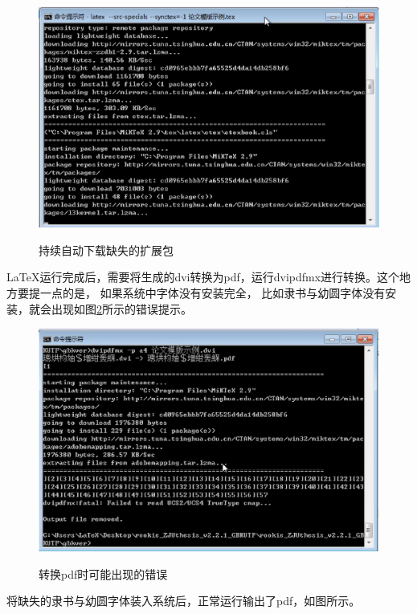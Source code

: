 \begin{figure}[th]
	\centering
	\includegraphics[scale=0.5]{./Pictures/l3kernel.eps}\\
	\caption{持续自动下载缺失的扩展包}
	\label{l3kernel}
\end{figure}

\newpage

\LaTeX 运行完成后，需要将生成的dvi转换为pdf，运行dvipdfmx进行转换。这个地方要提一点的是，
如果系统中字体没有安装完全， 比如隶书与幼圆字体没有安装，就会出现如图\ref{dvierror}所示的错误提示。

\begin{figure}[th]
	\centering
	\includegraphics[scale=0.5]{./Pictures/dvierror.eps}\\
	\caption{转换pdf时可能出现的错误}
	\label{dvierror}
\end{figure}

将缺失的隶书与幼圆字体装入系统后，正常运行输出了pdf，如图所示。

